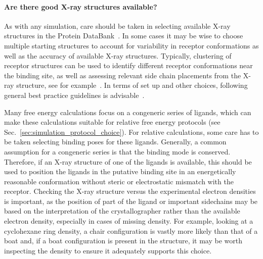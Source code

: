 \documentclass[9pt,bestpractices]{livecoms}
\begin{document}
\paragraph{Are there good X-ray structures available?}
As with any simulation, care should be taken in selecting available X-ray structures in the Protein DataBank~\cite{berman2003announcing}. In some cases it may be wise to choose multiple starting structures to account for variability in receptor conformations as well as the accuracy of available X-ray structures. Typically, clustering of receptor structures can be used to identify different receptor conformations near the binding site, as well as assessing relevant side chain placements from the X-ray structure, see for example~\cite{mey2016blinded}. In terms of set up and other choices, following general best practice guidelines is advisable~\cite{braun2019best}.

Many free energy calculations focus on a congeneric series of ligands, which can make these calculations suitable for relative free energy protocols (see Sec.~\ref{sec:simulation_protocol_choice}). For relative calculations, some care has to be taken selecting binding poses for these ligands. Generally, a common assumption for a congeneric series is that the binding mode is conserved. Therefore, if an X-ray structure of one of the ligands is available, this should be used to position the ligands in the putative binding site in an energetically reasonable conformation without steric or electrostatic mismatch with the receptor. Checking the X-ray structure versus the experimental electron densities is important, as the position of part of the ligand or important sidechains may be based on the interpretation of the crystallographer rather than the available electron density, especially in cases of missing density. For example, looking at a cyclohexane ring density, a chair configuration is vastly more likely than that of a boat and, if a boat configuration is present in the structure, it may be worth inspecting the density to ensure it adequately supports this choice. 
\end{document}
